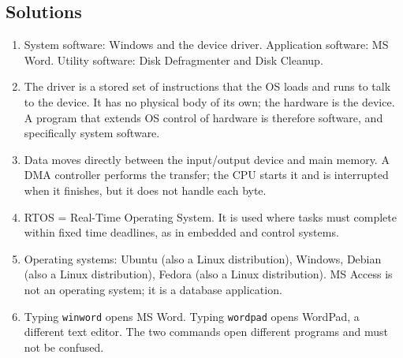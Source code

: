 \documentclass[11pt]{article}
\begin{document}
\subsection*{Solutions}
\begingroup\small
\begin{enumerate}[label=\arabic*.]
  \item System software: Windows and the device driver. Application
    software: MS Word. Utility software: Disk Defragmenter and Disk Cleanup.
  \item The driver is a stored set of instructions that the OS loads and
    runs to talk to the device. It has no physical body of its own; the
    hardware is the device. A program that extends OS control of hardware is
    therefore software, and specifically system software.
  \item Data moves directly between the input/output device and main memory.
    A DMA controller performs the transfer; the CPU starts it and is
    interrupted when it finishes, but it does not handle each byte.
  \item RTOS = Real-Time Operating System. It is used where tasks must
    complete within fixed time deadlines, as in embedded and control
    systems.
  \item Operating systems: Ubuntu (also a Linux distribution), Windows,
    Debian (also a Linux distribution), Fedora (also a Linux distribution).
    MS Access is not an operating system; it is a database application.
  \item Typing \texttt{winword} opens MS Word. Typing \texttt{wordpad} opens
    WordPad, a different text editor. The two commands open different
    programs and must not be confused.
\end{enumerate}
\endgroup
\end{document}
